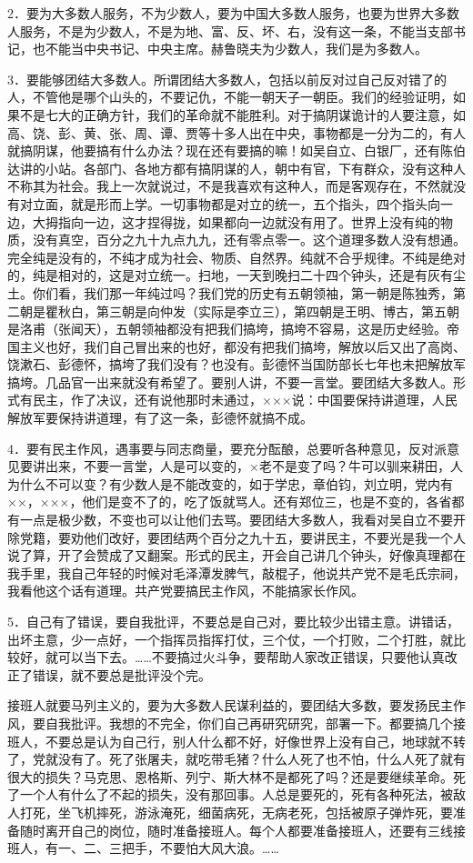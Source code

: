 2．要为大多数人服务，不为少数人，要为中国大多数人服务，也要为世界大多数人服务，不是为少数人，不是为地、富、反、坏、右，没有这一条，不能当支部书记，也不能当中央书记、中央主席。赫鲁晓夫为少数人，我们是为多数人。

3．要能够团结大多数人。所谓团结大多数人，包括以前反对过自己反对错了的人，不管他是哪个山头的，不要记仇，不能一朝天子一朝臣。我们的经验证明，如果不是七大的正确方针，我们的革命就不能胜利。对于搞阴谋诡计的人要注意，如高、饶、彭、黄、张、周、谭、贾等十多人出在中央，事物都是一分为二的，有人就搞阴谋，他要搞有什么办法？现在还有要搞的嘛！如吴自立、白银厂，还有陈伯达讲的小站。各部门、各地方都有搞阴谋的人，朝中有官，下有群众，没有这种人不称其为社会。我上一次就说过，不是我喜欢有这种人，而是客观存在，不然就没有对立面，就是形而上学。一切事物都是对立的统一，五个指头，四个指头向一边，大拇指向一边，这才捏得拢，如果都向一边就没有用了。世界上没有纯的物质，没有真空，百分之九十九点九九，还有零点零一。这个道理多数人没有想通。完全纯是没有的，不纯才成为社会、物质、自然界。纯就不合乎规律。不纯是绝对的，纯是相对的，这是对立统一。扫地，一天到晚扫二十四个钟头，还是有灰有尘土。你们看，我们那一年纯过吗？我们党的历史有五朝领袖，第一朝是陈独秀，第二朝是瞿秋白，第三朝是向仲发（实际是李立三），第四朝是王明、博古，第五朝是洛甫（张闻天），五朝领袖都没有把我们搞垮，搞垮不容易，这是历史经验。帝国主义也好，我们自己冒出来的也好，都没有把我们搞垮，解放以后又出了高岗、饶漱石、彭德怀，搞垮了我们没有？也没有。彭德怀当国防部长七年也未把解放军搞垮。几品官一出来就没有希望了。要别人讲，不要一言堂。要团结大多数人。形式有民主，作了决议，还有说他那时未通过，×××说：中国要保持讲道理，人民解放军要保持讲道理，有了这一条，彭德怀就搞不成。

4．要有民主作风，遇事要与同志商量，要充分酝酿，总要听各种意见，反对派意见要讲出来，不要一言堂，人是可以变的，×老不是变了吗？牛可以驯来耕田，人为什么不可以变？有少数人是不能改变的，如于学忠，章伯钧，刘立明，党内有××，×××，他们是变不了的，吃了饭就骂人。还有郑位三，也是不变的，各省都有一点是极少数，不变也可以让他们去骂。要团结大多数人，我看对吴自立不要开除党籍，要劝他们改好，要团结两个百分之九十五，要讲民主，不要光是我一个人说了算，开了会赞成了又翻案。形式的民主，开会自己讲几个钟头，好像真理都在我手里，我自己年轻的时候对毛泽潭发脾气，敲棍子，他说共产党不是毛氏宗祠，我看他这个话有道理。共产党要搞民主作风，不能搞家长作风。

5．自己有了错误，要自我批评，不要总是自己对，要比较少出错主意。讲错话，出坏主意，少一点好，一个指挥员指挥打仗，三个仗，一个打败，二个打胜，就比较好，就可以当下去。……不要搞过火斗争，要帮助人家改正错误，只要他认真改正了错误，就不要总是批评没个完。

接班人就要马列主义的，要为大多数人民谋利益的，要团结大多数，要发扬民主作风，要自我批评。我想的不完全，你们自己再研究研究，部署一下。都要搞几个接班人，不要总是认为自己行，别人什么都不好，好像世界上没有自己，地球就不转了，党就没有了。死了张屠夫，就吃带毛猪？什么人死了也不怕，什么人死了就有很大的损失？马克思、恩格斯、列宁、斯大林不是都死了吗？还是要继续革命。死了一个人有什么了不起的损失，没有那回事。人总是要死的，死有各种死法，被敌人打死，坐飞机摔死，游泳淹死，细菌病死，无病老死，包括被原子弹炸死，要准备随时离开自己的岗位，随时准备接班人。每个人都要准备接班人，还要有三线接班人，有一、二、三把手，不要怕大风大浪。……

